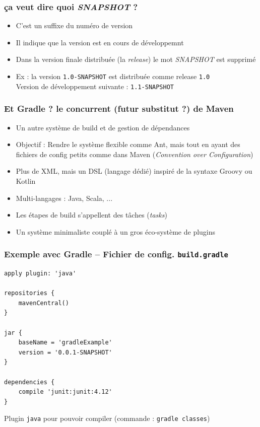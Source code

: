 \documentclass{beamer}
\begin{document}
\begin{frame}[fragile]
  \frametitle{ça veut dire quoi \textit{SNAPSHOT} ?}
  \begin{itemize}
  \item C'est un suffixe du numéro de version
  \item Il indique que la version est en cours de développemnt
  \item Dans la version finale distribuée (la \textit{release}) le mot
    \textit{SNAPSHOT} est supprimé
  \item Ex : la version \texttt{1.0-SNAPSHOT} est distribuée comme release  \texttt{1.0}\\
    Version de développement suivante : \texttt{1.1-SNAPSHOT}
    
  \end{itemize}    
\end{frame}

\begin{frame}[fragile]
  \frametitle{Et Gradle ? le concurrent (futur substitut ?) de Maven}
\begin{itemize}
\item Un autre système de build et de gestion de dépendances
\item Objectif : Rendre le système flexible comme Ant, mais tout en
  ayant des fichiers de config petits comme dans Maven (\textit{Convention
  over Configuration})
\item Plus de XML, mais un DSL (langage dédié) inspiré de la syntaxe
  Groovy ou Kotlin
\item Multi-langages : Java, Scala, ...
\item Les étapes de build s'appellent des tâches (\textit{tasks})
\item Un système minimaliste couplé à un gros éco-système de plugins
\end{itemize}
\end{frame}

\begin{frame}[fragile]
  \frametitle{Exemple avec Gradle -- Fichier de config. \texttt{build.gradle}}
\begin{lstlisting}[basicstyle=\scriptsize]
apply plugin: 'java'
 
repositories {
    mavenCentral()
}
 
jar {
    baseName = 'gradleExample'
    version = '0.0.1-SNAPSHOT'
}
 
dependencies {
    compile 'junit:junit:4.12'
}
\end{lstlisting}
Plugin \texttt{java} pour pouvoir compiler (commande : \texttt{gradle
  classes})
\end{frame}
\end{document}
